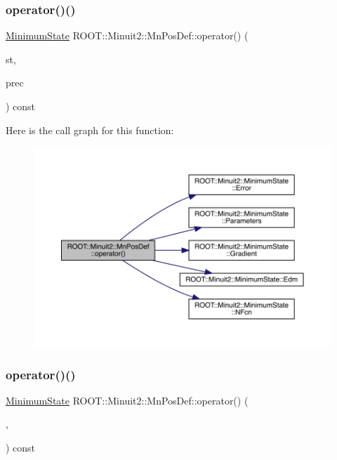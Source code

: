 \subsubsection{\texorpdfstring{operator()()}{operator()()}\hspace{0.1cm}{\footnotesize\ttfamily [1/6]}}
{\footnotesize\ttfamily \mbox{\hyperlink{classROOT_1_1Minuit2_1_1MinimumState}{Minimum\+State}} R\+O\+O\+T\+::\+Minuit2\+::\+Mn\+Pos\+Def\+::operator() (\begin{DoxyParamCaption}\item[{const \mbox{\hyperlink{classROOT_1_1Minuit2_1_1MinimumState}{Minimum\+State}} \&}]{st,  }\item[{const \mbox{\hyperlink{classROOT_1_1Minuit2_1_1MnMachinePrecision}{Mn\+Machine\+Precision}} \&}]{prec }\end{DoxyParamCaption}) const}

Here is the call graph for this function\+:
\nopagebreak
\begin{figure}[H]
\begin{center}
\leavevmode
\includegraphics[width=350pt]{d0/dab/classROOT_1_1Minuit2_1_1MnPosDef_a5a550c841e9b62d3c09cdf9df61a88f4_cgraph}
\end{center}
\end{figure}
\mbox{\label{classROOT_1_1Minuit2_1_1MnPosDef_a5a550c841e9b62d3c09cdf9df61a88f4}} 
\subsubsection{\texorpdfstring{operator()()}{operator()()}\hspace{0.1cm}{\footnotesize\ttfamily [2/6]}}
{\footnotesize\ttfamily \mbox{\hyperlink{classROOT_1_1Minuit2_1_1MinimumState}{Minimum\+State}} R\+O\+O\+T\+::\+Minuit2\+::\+Mn\+Pos\+Def\+::operator() (\begin{DoxyParamCaption}\item[{const \mbox{\hyperlink{classROOT_1_1Minuit2_1_1MinimumState}{Minimum\+State}} \&}]{,  }\item[{const \mbox{\hyperlink{classROOT_1_1Minuit2_1_1MnMachinePrecision}{Mn\+Machine\+Precision}} \&}]{ }\end{DoxyParamCaption}) const}

